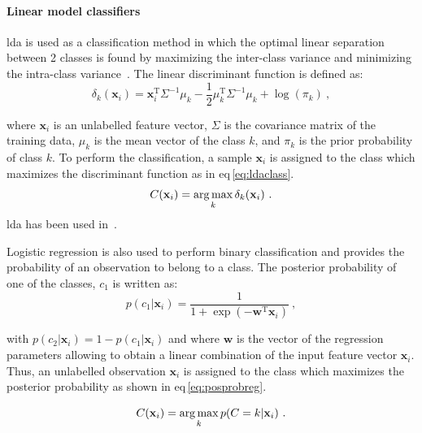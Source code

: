 \paragraph{Linear model classifiers}
\Acf{lda} is used as a classification method in which the optimal linear separation between 2 classes is found by maximizing the inter-class variance and minimizing the intra-class variance~\cite{Friedman1989}.
The linear discriminant function is defined as:
\begin{equation}
	\delta_{k}(\mathbf{x}_i) = \mathbf{x}_i^{\text{T}} \Sigma^{-1} \mu_k - \frac{1}{2} \mu_{k}^{\text{T}} \Sigma^{-1} \mu_k + \log (\pi_k) \ ,
	\label{eq:ldafun}
\end{equation}

\noindent where $\mathbf{x}_i$ is an unlabelled feature vector, $\Sigma$ is the covariance matrix of the training data, $\mu_k$ is the mean vector of the class $k$, and $\pi_k$ is the prior probability of class $k$.
To perform the classification, a sample $\mathbf{x}_i$ is assigned to the class which maximizes the discriminant function as in \acs{eq}\,\eqref{eq:ldaclass}.
\begin{equation}
	C(\mathbf{x}_i) = \operatorname*{arg\,max}_k \delta_k(\mathbf{x}_i) \ .
	\label{eq:ldaclass}
\end{equation}
\Ac{lda} has been used in~\cite{Antic2013,Chan2003,Niaf2011,Niaf2012,Vos2012}.


Logistic regression is also used to perform binary classification and provides the probability of an observation to belong to a class.
The posterior probability of one of the classes, $c_1$ is written as:
\begin{equation}
	p(c_1|\mathbf{x}_i) = \frac{1}{1+\exp(-\mathbf{w}^{\text{T}}\mathbf{x}_i)} \ ,
	\label{eq:postprlr}
\end{equation}

\noindent with $p(c_2|\mathbf{x}_i) = 1 - p(c_1|\mathbf{x}_i)$ and where $\mathbf{w}$ is the vector of the regression parameters allowing to obtain a linear combination of the input feature vector $\mathbf{x}_i$.
Thus, an unlabelled observation $\mathbf{x}_i$ is assigned to the class which maximizes the posterior probability as shown in \acs{eq}\,\eqref{eq:posprobreg}.

\begin{equation}
	C(\mathbf{x}_i) = \operatorname*{arg\,max}_k p(C=k|\mathbf{x}_i) \ .
	\label{eq:posprobreg}
\end{equation}

